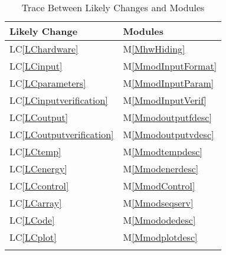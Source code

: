 \documentclass[12pt]{article}
\begin{document}
\begin{longtable}{l l}
\toprule
Likely Change & Modules
\\
\midrule
LC\ref{LChardware} & M\ref{MhwHiding}
\\
LC\ref{LCinput} & M\ref{MmodInputFormat}
\\
LC\ref{LCparameters} & M\ref{MmodInputParam}
\\
LC\ref{LCinputverification} & M\ref{MmodInputVerif}
\\
LC\ref{LCoutput} & M\ref{Mmodoutputfdesc}
\\
LC\ref{LCoutputverification} & M\ref{Mmodoutputvdesc}
\\
LC\ref{LCtemp} & M\ref{Mmodtempdesc}
\\
LC\ref{LCenergy} & M\ref{Mmodenerdesc}
\\
LC\ref{LCcontrol} & M\ref{MmodControl}
\\
LC\ref{LCarray} & M\ref{Mmodseqserv}
\\
LC\ref{LCode} & M\ref{Mmododedesc}
\\
LC\ref{LCplot} & M\ref{Mmodplotdesc}
\\
\bottomrule
\caption{Trace Between Likely Changes and Modules}
\label{Table:TracBetwLikeChanandModu}
\end{longtable}
\end{document}

